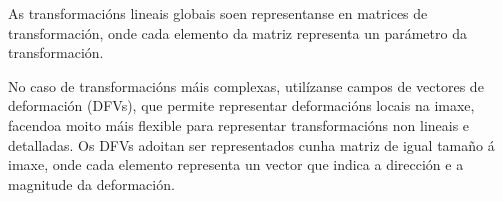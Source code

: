             
            

As transformacións lineais globais soen representanse en matrices de transformación, onde cada elemento da matriz representa un parámetro da transformación.

No caso de transformacións máis complexas, utilízanse campos de vectores de deformación (\gls{DFV}s), que permite representar deformacións locais na imaxe, facendoa moito máis flexible para representar transformacións non lineais e detalladas.
Os DFVs adoitan ser representados cunha matriz de igual tamaño á imaxe, onde cada elemento representa un vector que indica a dirección e a magnitude da deformación.

